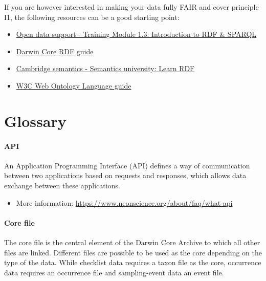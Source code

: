 \documentclass[
]{book}
\providecommand{\tightlist}{%
  \setlength{\itemsep}{0pt}\setlength{\parskip}{0pt}}
\begin{document}
If you are however interested in making your data fully FAIR and cover principle I1, the following resources can be a good starting point:

\begin{itemize}
\item
  \href{https://data.europa.eu/sites/default/files/d2.1.2_training_module_1.3_introduction_to_rdf_sparql_en_edp.pdf}{Open data support - Training Module 1.3: Introduction to RDF \& SPARQL}
\item
  \href{https://dwc.tdwg.org/rdf/}{Darwin Core RDF guide}
\item
  \href{https://cambridgesemantics.com/blog/semantic-university/learn-rdf/}{Cambridge semantics - Semantics university: Learn RDF}
\item
  \href{https://www.w3.org/TR/owl-guide/}{W3C Web Ontology Language guide}
\end{itemize}

\hypertarget{glossary}{%
\chapter{Glossary}\label{glossary}}

\hypertarget{API}{%
\subsubsection*{API}\label{API}}

An Application Programming Interface (API) defines a way of communication between two applications based on requests and responses, which allows data exchange between these applications.

\begin{itemize}
\tightlist
\item
  More information: \url{https://www.neonscience.org/about/faq/what-api}
\end{itemize}

\hypertarget{core}{%
\subsubsection*{Core file}\label{core}}

The core file is the central element of the Darwin Core Archive to which all other files are linked. Different files are possible to be used as the core depending on the type of the data. While checklist data requires a taxon file as the core, occurrence data requires an occurrence file and sampling-event data an event file.
\end{document}
